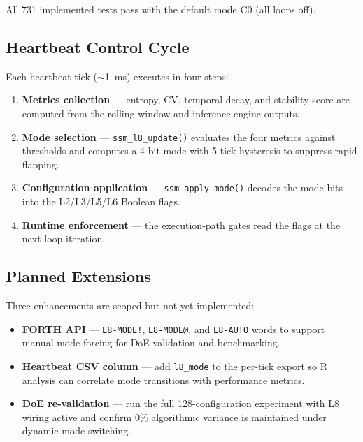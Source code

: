 All 731 implemented tests pass with the default mode C0 (all loops off).

\subsection{Heartbeat Control Cycle}

Each heartbeat tick ($\sim$1~ms) executes in four steps:

\begin{enumerate}
  \item \textbf{Metrics collection} — entropy, CV, temporal decay, and stability
        score are computed from the rolling window and inference engine outputs.
  \item \textbf{Mode selection} — \texttt{ssm\_l8\_update()} evaluates the four
        metrics against thresholds and computes a 4-bit mode with 5-tick
        hysteresis to suppress rapid flapping.
  \item \textbf{Configuration application} — \texttt{ssm\_apply\_mode()} decodes
        the mode bits into the L2/L3/L5/L6 Boolean flags.
  \item \textbf{Runtime enforcement} — the execution-path gates read the flags
        at the next loop iteration.
\end{enumerate}

\subsection{Planned Extensions}

Three enhancements are scoped but not yet implemented:

\begin{itemize}
  \item \textbf{FORTH API} — \texttt{L8-MODE!}, \texttt{L8-MODE@}, and
        \texttt{L8-AUTO} words to support manual mode forcing for DoE validation
        and benchmarking.
  \item \textbf{Heartbeat CSV column} — add \texttt{l8\_mode} to the per-tick
        export so R analysis can correlate mode transitions with performance
        metrics.
  \item \textbf{DoE re-validation} — run the full 128-configuration experiment
        with L8 wiring active and confirm 0\% algorithmic variance is maintained
        under dynamic mode switching.
\end{itemize}
